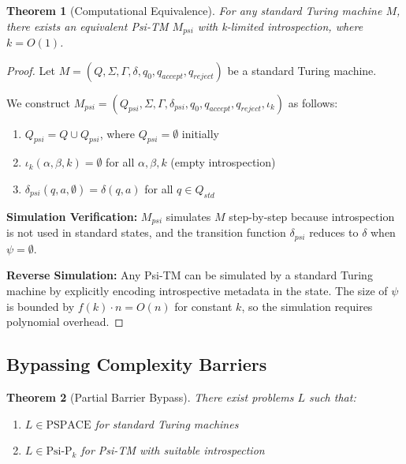 \documentclass[11pt]{article}
\newtheorem{theorem}{Theorem}
\begin{document}
\begin{theorem}[Computational Equivalence]
For any standard Turing machine $M$, there exists an equivalent Psi-TM $M_{psi}$ with k-limited introspection, where $k = O(1)$.
\end{theorem}

\begin{proof}
Let $M = (Q, \Sigma, \Gamma, \delta, q_0, q_{accept}, q_{reject})$ be a standard Turing machine.

We construct $M_{psi} = (Q_{psi}, \Sigma, \Gamma, \delta_{psi}, q_0, q_{accept}, q_{reject}, \iota_k)$ as follows:

\begin{enumerate}
\item $Q_{psi} = Q \cup Q_{psi}$, where $Q_{psi} = \emptyset$ initially
\item $\iota_k(\alpha, \beta, k) = \emptyset$ for all $\alpha, \beta, k$ (empty introspection)
\item $\delta_{psi}(q, a, \emptyset) = \delta(q, a)$ for all $q \in Q_{std}$
\end{enumerate}

\textbf{Simulation Verification:} 
$M_{psi}$ simulates $M$ step-by-step because introspection is not used in standard states, and the transition function $\delta_{psi}$ reduces to $\delta$ when $\psi = \emptyset$.

\textbf{Reverse Simulation:}
Any Psi-TM can be simulated by a standard Turing machine by explicitly encoding introspective metadata in the state. The size of $\psi$ is bounded by $f(k) \cdot n = O(n)$ for constant $k$, so the simulation requires polynomial overhead.
\end{proof}

\subsection{Bypassing Complexity Barriers}

\begin{theorem}[Partial Barrier Bypass]
There exist problems $L$ such that:
\begin{enumerate}
\item $L \in \text{PSPACE}$ for standard Turing machines
\item $L \in \text{Psi-P}_k$ for Psi-TM with suitable introspection
\end{enumerate}
\end{theorem}
\end{document}
